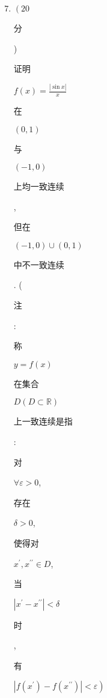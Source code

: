 \documentclass[10pt]{article}
\begin{document}
\begin{enumerate}
  \setcounter{enumi}{6}
  \item $\left(20\right.$ \begin{CJK}{UTF8}{mj}分\end{CJK}) \begin{CJK}{UTF8}{mj}证明\end{CJK} $f(x)=\frac{|\sin x|}{x}$ \begin{CJK}{UTF8}{mj}在\end{CJK} $(0,1)$ \begin{CJK}{UTF8}{mj}与\end{CJK} $(-1,0)$ \begin{CJK}{UTF8}{mj}上均一致连续\end{CJK}, \begin{CJK}{UTF8}{mj}但在\end{CJK} $(-1,0) \cup(0,1)$ \begin{CJK}{UTF8}{mj}中不一致连续\end{CJK}. (\begin{CJK}{UTF8}{mj}注\end{CJK}: \begin{CJK}{UTF8}{mj}称\end{CJK} $y=f(x)$ \begin{CJK}{UTF8}{mj}在集合\end{CJK} $D(D \subset \mathbb{R})$ \begin{CJK}{UTF8}{mj}上一致连续是指\end{CJK}: \begin{CJK}{UTF8}{mj}对\end{CJK} $\forall \varepsilon>0$, \begin{CJK}{UTF8}{mj}存在\end{CJK} $\delta>0$, \begin{CJK}{UTF8}{mj}使得对\end{CJK} $x^{\prime}, x^{\prime \prime} \in D$, \begin{CJK}{UTF8}{mj}当\end{CJK} $\left|x^{\prime}-x^{\prime \prime}\right|<\delta$ \begin{CJK}{UTF8}{mj}时\end{CJK}, \begin{CJK}{UTF8}{mj}有\end{CJK} $\left.\left|f\left(x^{\prime}\right)-f\left(x^{\prime \prime}\right)\right|<\varepsilon\right)$


\end{enumerate}
\end{document}
